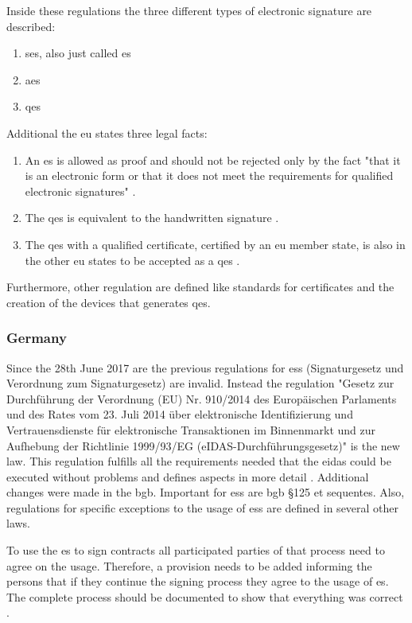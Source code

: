 Inside these regulations the three different types of electronic signature are described: 
\begin{enumerate}
	\item \Gls{ses}, also just called \gls{es}
	\item \Gls{aes}
	\item \Gls{qes}
\end{enumerate}
Additional the \gls{eu} states three legal facts: 
\begin{enumerate}
	\item An \gls{es} is allowed as proof and should not be rejected only by the fact "that it is an electronic form or that it does not meet the requirements for qualified electronic signatures" \parencite[Article 25 § 1]{eIDAS2014}.
	\item The \gls{qes} is equivalent to the handwritten signature \parencite[Article 25 § 2]{eIDAS2014}.
	\item The \gls{qes} with a qualified certificate, certified by an \gls{eu} member state, is also in the other \gls{eu} states to be accepted as a \gls{qes} \parencite[Article 25 § 3]{eIDAS2014}.
\end{enumerate}
Furthermore, other regulation are defined like standards for certificates and the creation of the devices that generates \gls{qes}.

\subsubsection{Germany}
Since the 28th June 2017 are the previous regulations for \glspl{es} (Signaturgesetz und Verordnung zum Signaturgesetz) are invalid. Instead the regulation "Gesetz zur Durchführung der Verordnung (EU) Nr. 910/2014 des Europäischen Parlaments und des Rates vom 23. Juli 2014 über elektronische Identifizierung und Vertrauensdienste für elektronische Transaktionen im Binnenmarkt und zur Aufhebung der Richtlinie 1999/93/EG (eIDAS-Durchführungsgesetz)" \parencite{Bundestag2017} is the new law. This regulation fulfills all the requirements needed that the \gls{eidas} could be executed without problems and defines aspects in more detail \parencite{Bundesanzeiger2017}.
Additional changes were made in the \gls{bgb}. Important for \glspl{es} are \gls{bgb} §125 et sequentes. Also, regulations for specific exceptions to the usage of \glspl{es} are defined in several other laws.  

To use the \gls{es} to sign contracts all participated parties of that process need to agree on the usage. Therefore, a provision needs to be added informing the persons that if they continue the signing process they agree to the usage of \gls{es}. The complete process should be documented to show that everything was correct \parencite{Herfrid2017}.


